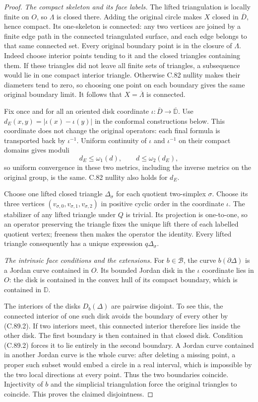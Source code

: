 \begin{proof}
\emph{The compact skeleton and its face labels.}
The lifted triangulation is locally finite
on $O$, so $\Lambda$ is closed there.
Adding the original circle makes $X$
closed in $\overline D$, hence compact.
Its one-skeleton is connected: any two
vertices are joined by a finite edge
path in the connected triangulated
surface, and each edge belongs to that
same connected set.
Every original boundary point is in
the closure of $\Lambda$. Indeed choose
interior points tending to it and the
closed triangles containing them.
If these triangles did not leave all
finite sets of triangles, a subsequence
would lie in one compact interior
triangle. Otherwise C.82 nullity makes
their diameters tend to zero, so choosing
one point on each boundary gives the
same original boundary limit.
It follows that $X=\overline\Lambda$
is connected.

Fix once and for all an oriented disk
coordinate
$\iota:\overline D\to\overline{\mathbb D}$.
Use $d_E(x,y)=|\iota(x)-\iota(y)|$ in the
conformal constructions below. This
coordinate does not change the original
operators: each final formula is
transported back by $\iota^{-1}$.
Uniform continuity of $\iota$ and
$\iota^{-1}$ on their compact domains
gives moduli
\[
              d_E\leq\omega_1(d),\qquad
                    d\leq\omega_2(d_E),                       \tag{C.89.4}
\]
so uniform convergence in these two
metrics, including the inverse metrics
on the original group, is the same.
C.82 nullity also holds for $d_E$.

Choose one lifted closed triangle
$\Delta_\sigma$ for each quotient
two-simplex $\sigma$.
Choose its three vertices
$(v_{\sigma,0},v_{\sigma,1},v_{\sigma,2})$
in positive cyclic order in the
coordinate $\iota$.
The stabilizer of any lifted triangle
under $Q$ is trivial. Its projection
is one-to-one, so an operator preserving
the triangle fixes the unique lift
there of each labelled quotient
vertex; freeness then makes the
operator the identity.
Every lifted triangle consequently has
a unique expression $q\Delta_\sigma$.

\emph{The intrinsic face conditions and the extensions.}
For $b\in\mathscr B$, the curve
$b(\partial\Delta)$ is a Jordan curve
contained in $O$.
Its bounded Jordan disk in the
$\iota$ coordinate lies in $O$:
the disk is contained in the convex
hull of its compact boundary, which
is contained in $\mathbb D$.

The interiors of the disks
$D_b(\Delta)$ are pairwise disjoint.
To see this, the connected interior
of one such disk avoids the boundary
of every other by (C.89.2).
If two interiors meet, this connected
interior therefore lies inside the
other disk. The first boundary is
then contained in that closed disk.
Condition (C.89.2) forces it to lie
entirely in the second boundary.
A Jordan curve contained in another
Jordan curve is the whole curve:
after deleting a missing point,
a proper such subset would embed a
circle in a real interval, which
is impossible by the two local
directions at every point.
Thus the two boundaries coincide.
Injectivity of $b$ and the simplicial
triangulation force the original
triangles to coincide. This proves
the claimed disjointness.


\end{proof}
